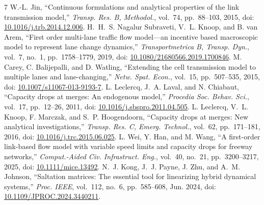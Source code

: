 \documentclass[10pt,a4paper]{article}
\newcommand{\head}[1]{\par\vspace{4pt}\noindent\textbf{#1}\par\nobreak\vspace{1pt}}
\begin{document}
\makeatletter
\renewcommand{\section}{\@ifstar{\head}{\head}}
\makeatother
\begin{thebibliography}{7}
\setlength{\itemsep}{0pt}\setlength{\parskip}{0pt}
 W.-L. Jin, ``Continuous formulations and analytical properties
of the link transmission model,'' \emph{Transp. Res. B, Methodol.}, vol.~74,
pp.~88--103, 2015, doi: \href{https://doi.org/10.1016/j.trb.2014.12.006}{10.1016/j.trb.2014.12.006}.
 H.~H.~S. Nagalur Subraveti, V.~L. Knoop, and B. van Arem,
``First order multi-lane traffic flow model---an incentive based macroscopic
model to represent lane change dynamics,'' \emph{Transportmetrica B, Transp.
Dyn.}, vol.~7, no.~1, pp.~1758--1779, 2019, doi:
\href{https://doi.org/10.1080/21680566.2019.1700846}{10.1080/21680566.2019.1700846}.
 M. Carey, C. Balijepalli, and D. Watling, ``Extending the cell
transmission model to multiple lanes and lane-changing,'' \emph{Netw. Spat.
Econ.}, vol.~15, pp.~507--535, 2015, doi:
\href{https://doi.org/10.1007/s11067-013-9193-7}{10.1007/s11067-013-9193-7}.
 L. Leclercq, J.~A. Laval, and N. Chiabaut,
``Capacity drops at merges: An endogenous model,'' \emph{Procedia Soc.
Behav. Sci.}, vol.~17, pp.~12--26, 2011, doi:
\href{https://doi.org/10.1016/j.sbspro.2011.04.505}{10.1016/j.sbspro.2011.04.505}.
 L. Leclercq, V.~L. Knoop, F. Marczak, and S.~P. Hoogendoorn,
``Capacity drops at merges: New analytical investigations,'' \emph{Transp.
Res. C, Emerg. Technol.}, vol.~62, pp.~171--181, 2016, doi:
\href{https://doi.org/10.1016/j.trc.2015.06.025}{10.1016/j.trc.2015.06.025}.
 L. Wei, Y. Han, and M. Wang, ``A first-order link-based flow
model with variable speed limits and capacity drops for freeway networks,''
\emph{Comput.-Aided Civ. Infrastruct. Eng.}, vol.~40, no.~21,
pp.~3200--3217, 2025, doi:
\href{https://doi.org/10.1111/mice.13492}{10.1111/mice.13492}.
 N.~J. Kong, J.~J. Payne, J. Zhu, and A.~M. Johnson,
``Saltation matrices: The essential tool for linearizing hybrid dynamical
systems,'' \emph{Proc. IEEE}, vol.~112, no.~6, pp.~585--608, Jun. 2024, doi:
\href{https://doi.org/10.1109/JPROC.2024.3440211}{10.1109/JPROC.2024.3440211}.
\end{thebibliography}
\end{document}
